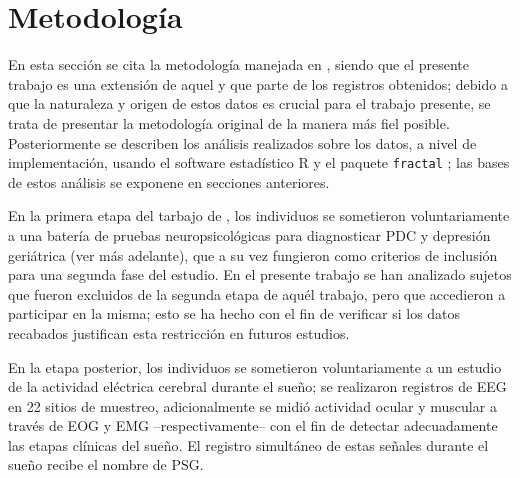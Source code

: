 \chapter{Metodolog\'ia}

En esta secci\'on se cita la metodolog\'ia 
manejada en \cite{VazquezTagle16}, 
siendo que el presente trabajo es una extensi\'on de aquel y que parte de los registros obtenidos;
debido a que la naturaleza y origen de estos datos es crucial para el trabajo presente, se trata de
presentar la metodolog\'ia original de la manera m\'as fiel posible.
Posteriormente se describen los an\'alisis realizados
sobre los datos, a nivel de implementaci\'on, usando el software estad\'istico R
y el paquete \texttt{fractal} \cite{R_citar,R_fractal};
las bases de estos an\'alisis se exponene en secciones anteriores.

En la primera etapa del tarbajo de \cite{VazquezTagle16},
los individuos se sometieron voluntariamente a una bater\'ia de pruebas
neuropsicol\'ogicas para diagnosticar PDC y depresi\'on geri\'atrica (ver m\'as adelante), 
que a su vez fungieron como criterios de
inclusi\'on para una segunda fase del estudio.
En el presente trabajo se han analizado sujetos que fueron excluidos de la segunda etapa de aqu\'el
trabajo, pero que accedieron a participar en la misma; esto se ha hecho con el fin de
verificar si los datos recabados justifican esta restricci\'on en futuros estudios.

En la etapa posterior, los individuos se sometieron voluntariamente a un estudio de la
actividad el\'ectrica cerebral durante el
sue\~no; se realizaron
registros de EEG en 22 sitios de muestreo, adicionalmente se midi\'o
actividad ocular y muscular a trav\'es de EOG y EMG --respectivamente-- con
el fin de detectar adecuadamente las etapas cl\'inicas del sue\~no\cite{AASM07}.
El registro simult\'aneo de estas se\~nales durante el sue\~no recibe el nombre de PSG.


